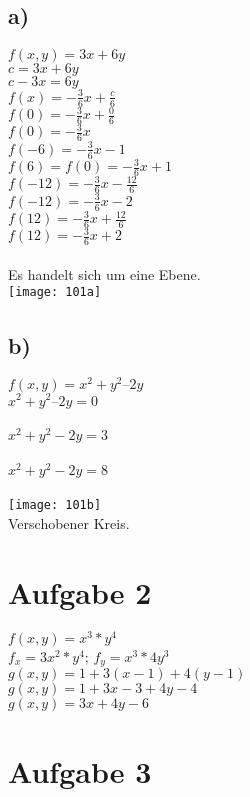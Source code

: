 \documentclass{article}
\begin{document}
	\subsection*{a)}
	$f(x,y) = 3x + 6y$ \\
	$c = 3x + 6y$ \\
	$c - 3x = 6y$ \\
	$f(x) = -\frac{3}{6}x + \frac{c}{6}$ \\
	$f(0) = -\frac{3}{6}x + \frac{0}{6}$ \\
	$f(0) = -\frac{3}{6}x$ \\
	$f(-6) = -\frac{3}{6}x - 1$ \\
	$f(6) = f(0) = -\frac{3}{6}x + 1$ \\
	$f(-12) = -\frac{3}{6}x - \frac{12}{6}$ \\
	$f(-12) = -\frac{3}{6}x - 2$ \\
	$f(12) = -\frac{3}{6}x + \frac{12}{6}$ \\
	$f(12) = -\frac{3}{6}x + 2$ \\ \\
	Es handelt sich um eine Ebene. \\
	\texttt{[image: 101a]}
	
	\subsection*{b)}
	$f(x, y) = x^2+ y^2–2y$ \\
	$x^2+ y^2–2y = 0$ \\ \\
	$x^2 + y^2 - 2y = 3$ \\ \\
	$x^2 + y^2 - 2y = 8$ \\ \\
	\texttt{[image: 101b]} \\
	Verschobener Kreis.
	\section*{Aufgabe 2}
	$f(x,y) = x^3 * y^4$ \\
	$f_x = 3x^2 * y^4$; $f_y = x^3 * 4y^3$ \\
	$g(x,y) = 1 + 3(x-1) + 4(y - 1)$ \\
	$g(x,y) = 1 + 3x - 3 + 4y - 4$ \\
	$g(x,y) = 3x +  4y -6$ \\
	\section*{Aufgabe 3}
\end{document}
